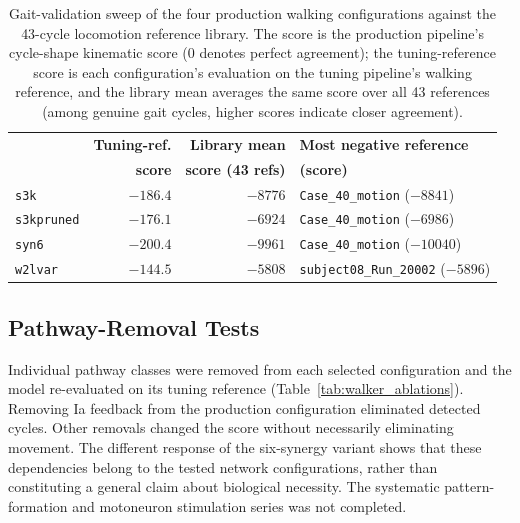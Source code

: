 \begin{table}[htbp]
\caption{Gait-validation sweep of the four production walking configurations against the 43-cycle locomotion reference library. The score is the production pipeline's cycle-shape kinematic score (0 denotes perfect agreement); the tuning-reference score is each configuration's evaluation on the tuning pipeline's walking reference, and the library mean averages the same score over all 43 references (among genuine gait cycles, higher scores indicate closer agreement).}
\label{tab:gait_sweep}
\begin{tabular}{@{}lrrl@{}}
\toprule
 & \textbf{Tuning-ref.} & \textbf{Library mean} & \textbf{Most negative reference} \\
 & \textbf{score} & \textbf{score (43 refs)} & \textbf{(score)} \\
\midrule
\texttt{s3k}        & $-186.4$ & $-8776$ & \texttt{Case\_40\_motion} ($-8841$) \\
\texttt{s3kpruned}  & $-176.1$ & $-6924$ & \texttt{Case\_40\_motion} ($-6986$) \\
\texttt{syn6}       & $-200.4$ & $-9961$ & \texttt{Case\_40\_motion} ($-10040$) \\
\texttt{w2lvar}     & $-144.5$ & $-5808$ & \texttt{subject08\_Run\_20002} ($-5896$) \\
\bottomrule
\end{tabular}
\end{table}

\subsection{Pathway-Removal Tests}\label{sec:walker_variant_results}

Individual pathway classes were removed from each selected configuration and the model re-evaluated on its tuning reference (Table~\ref{tab:walker_ablations}). Removing Ia feedback from the production configuration eliminated detected cycles. Other removals changed the score without necessarily eliminating movement. The different response of the six-synergy variant shows that these dependencies belong to the tested network configurations, rather than constituting a general claim about biological necessity. The systematic pattern-formation and motoneuron stimulation series was not completed.

